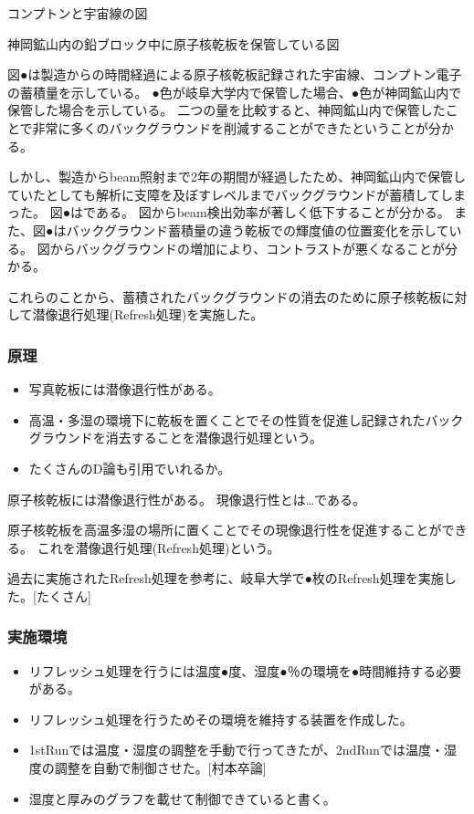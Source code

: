 \documentclass[12pt,a4paper]{jarticle}
\begin{document}
コンプトンと宇宙線の図
\par
神岡鉱山内の鉛ブロック中に原子核乾板を保管している図
\par
図●は製造からの時間経過による原子核乾板記録された宇宙線、コンプトン電子の蓄積量を示している。
●色が岐阜大学内で保管した場合、●色が神岡鉱山内で保管した場合を示している。
二つの量を比較すると、神岡鉱山内で保管したことで非常に多くのバックグラウンドを削減することができたということが分かる。
\par
しかし、製造からbeam照射まで2年の期間が経過したため、神岡鉱山内で保管していたとしても解析に支障を及ぼすレベルまでバックグラウンドが蓄積してしまった。
図●はである。
図からbeam検出効率が著しく低下することが分かる。
また、図●はバックグラウンド蓄積量の違う乾板での輝度値の位置変化を示している。
図からバックグラウンドの増加により、コントラストが悪くなることが分かる。
\par
これらのことから、蓄積されたバックグラウンドの消去のために原子核乾板に対して潜像退行処理(Refresh処理)を実施した。
\subsubsection{原理}
\begin{itemize}
 \item 写真乾板には潜像退行性がある。
 \item 高温・多湿の環境下に乾板を置くことでその性質を促進し記録されたバックグラウンドを消去することを潜像退行処理という。
 \item たくさんのD論も引用でいれるか。
\end{itemize}
原子核乾板には潜像退行性がある。
現像退行性とは…である。
\par
原子核乾板を高温多湿の場所に置くことでその現像退行性を促進することができる。
これを潜像退行処理(Refresh処理)という。
\par
過去に実施されたRefresh処理を参考に、岐阜大学で●枚のRefresh処理を実施した。[たくさん]
\subsubsection{実施環境}
\begin{itemize}
 \item リフレッシュ処理を行うには温度●度、湿度●％の環境を●時間維持する必要がある。
 \item リフレッシュ処理を行うためその環境を維持する装置を作成した。
 \item 1stRunでは温度・湿度の調整を手動で行ってきたが、2ndRunでは温度・湿度の調整を自動で制御させた。[村本卒論]
 \item 湿度と厚みのグラフを載せて制御できていると書く。
\end{itemize}
\end{document}
